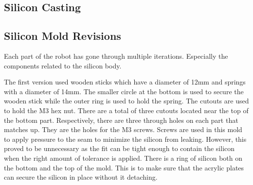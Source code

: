 \documentclass[twoside]{article}
\begin{document}
\subsection{Silicon Casting}
\blindtext
{}
\subsection{Silicon Mold Revisions}
Each part of the robot has gone through multiple iterations. Especially the components related to the silicon body. 

The first version used wooden sticks which have a diameter of 12mm and springs with a diameter of 14mm. The smaller circle at the bottom is used to secure the wooden stick while the outer ring is used to hold the spring. The cutouts are used to hold the M3 hex nut. There are a total of three cutouts located near the top of the bottom part. Respectively, there are three through holes on each part that matches up. They are the holes for the M3 screws. Screws are used in this mold to apply pressure to the seam to minimize the silicon from leaking. However, this proved to be unnecessary as the fit can be tight enough to contain the silicon when the right amount of tolerance is applied. There is a ring of silicon both on the bottom and the top of the mold. This is to make sure that the acrylic plates can secure the silicon in place without it detaching.
\end{document}
